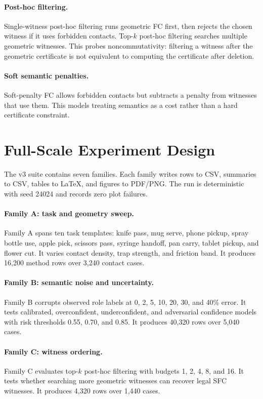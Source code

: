 \documentclass{article}
\begin{document}
\paragraph{Post-hoc filtering.}
Single-witness post-hoc filtering runs geometric FC first, then rejects the chosen witness if it uses forbidden contacts. Top-\(k\) post-hoc filtering searches multiple geometric witnesses. This probes noncommutativity: filtering a witness after the geometric certificate is not equivalent to computing the certificate after deletion.

\paragraph{Soft semantic penalties.}
Soft-penalty FC allows forbidden contacts but subtracts a penalty from witnesses that use them. This models treating semantics as a cost rather than a hard certificate constraint.

\section{Full-Scale Experiment Design}

The v3 suite contains seven families. Each family writes rows to CSV, summaries to CSV, tables to \LaTeX, and figures to PDF/PNG. The run is deterministic with seed 24024 and records zero plot failures.

\paragraph{Family A: task and geometry sweep.}
Family A spans ten task templates: knife pass, mug serve, phone pickup, spray bottle use, apple pick, scissors pass, syringe handoff, pan carry, tablet pickup, and flower cut. It varies contact density, trap strength, and friction band. It produces 16,200 method rows over 3,240 contact cases.

\paragraph{Family B: semantic noise and uncertainty.}
Family B corrupts observed role labels at 0, 2, 5, 10, 20, 30, and 40\% error. It tests calibrated, overconfident, underconfident, and adversarial confidence models with risk thresholds 0.55, 0.70, and 0.85. It produces 40,320 rows over 5,040 cases.

\paragraph{Family C: witness ordering.}
Family C evaluates top-\(k\) post-hoc filtering with budgets 1, 2, 4, 8, and 16. It tests whether searching more geometric witnesses can recover legal SFC witnesses. It produces 4,320 rows over 1,440 cases.
\end{document}
